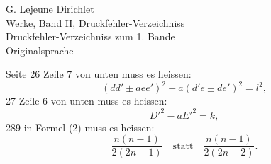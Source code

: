 \documentclass[11pt]{article}
\newcommand{\paperhead}[3]{\begin{center}{\Large G. Lejeune Dirichlet}\\[0.25em]{\large Werke, Band II, #1}\\[0.75em]{\LARGE #2}\\[0.35em]{\large #3}\end{center}\bigskip}
\begin{document}
\paperhead{Druckfehler-Verzeichniss}{Druckfehler-Verzeichniss zum 1. Bande}{Originalsprache}

Seite 26 Zeile 7 von unten muss es heissen:
\[
(dd'\pm aee')^2-a(d'e\pm de')^2=l^2,
\]
27 Zeile 6 von unten muss es heissen:
\[
D'^2-aE'^2=k,
\]
289 in Formel (2) muss es heissen:
\[
\frac{n(n-1)}{2(2n-1)}
\quad\text{statt}\quad
\frac{n(n-1)}{2(2n-2)}.
\]
\end{document}
